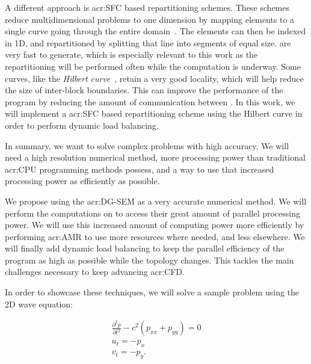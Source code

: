 A different approach is \acrfull{acr:SFC} based repartitioning schemes. These schemes reduce
multidimensional problems to one dimension by mapping elements to a single curve going through the
entire domain~\cite{Peano1890}. The elements can then be indexed in 1D, and repartitioned by
splitting that line into segments of equal size.  are very fast to generate,
which is especially relevant to this work as the repartitioning will be performed often while the
computation is underway. Some curves, like the \textit{Hilbert curve}~\cite{Hilbert1891}, retain a
very good locality, which will help reduce the size of inter-block boundaries. This can improve the
performance of the program by reducing the amount of communication between . In
this work, we will implement a \acrshort{acr:SFC} based repartitioning scheme using the Hilbert
curve in order to perform dynamic load balancing.

In summary, we want to solve complex problems with high accuracy. We will need a high resolution
numerical method, more processing power than traditional \acrshort{acr:CPU} programming methods
possess, and a way to use that increased processing power as efficiently as possible. 

We propose using the \acrlong{acr:DG-SEM} as a very accurate numerical method. We will perform the
computations on  to access their great amount of parallel processing power. We
will use this increased amount of computing power more efficiently by performing \acrlong{acr:AMR}
to use more resources where needed, and less elsewhere. We will finally add dynamic load balancing
to keep the parallel efficiency of the program as high as possible while the topology changes. This
tackles the main challenges necessary to keep advancing \acrshort{acr:CFD}.

In order to showcase these techniques, we will solve a sample problem using the 2D wave equation:

\begin{gather}
	\frac{\partial^2p}{\partial t^2} - c^2(p_{xx} + p_{yy}) = 0 \\
	u_t = - p_x \\
	v_t = -p_y.
\end{gather}

